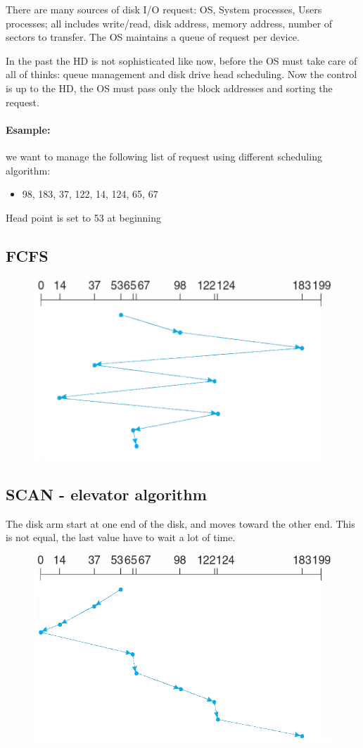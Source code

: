 There are many sources of disk I/O request: OS, System processes, Users processes; all includes write/read, disk address,
memory address, number of sectors to transfer. The OS maintains a queue of request per device.

In the past the HD is not sophisticated like now, before the OS must take care of all of thinks: queue management and disk
drive head scheduling. Now the control is up to the HD, the OS must pass only the block addresses and sorting the request.

\paragraph{Esample: } we want to manage the following list of request using different scheduling algorithm:

\begin{itemize}
\centering
    \item[] 98, 183, 37, 122, 14, 124, 65, 67
\end{itemize}

Head point is set to 53 at beginning

\newpage
\subsection{FCFS}

\begin{figure}[h!]
    \centering
    \includegraphics[width=0.5\linewidth]{img/Immagine 2024-05-22 183104.png}
\end{figure}

\subsection{SCAN - elevator algorithm}

The disk arm start at one end of the disk, and moves toward the
other end. This is not equal, the last value have to wait a lot of time.

\begin{figure}[h!]
    \centering
    \includegraphics[width=0.5\linewidth]{img/Immagine 2024-05-22 183628.png}
\end{figure}

